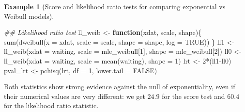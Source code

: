 \documentclass[
  11pt,
  letterpaper,
]{scrbook}
\newenvironment{Shaded}{\begin{snugshade}}{\end{snugshade}}
\newcommand{\AttributeTok}[1]{\textcolor[rgb]{0.40,0.45,0.13}{#1}}
\newcommand{\ConstantTok}[1]{\textcolor[rgb]{0.56,0.35,0.01}{#1}}
\newcommand{\ControlFlowTok}[1]{\textcolor[rgb]{0.00,0.23,0.31}{\textbf{#1}}}
\newcommand{\DecValTok}[1]{\textcolor[rgb]{0.68,0.00,0.00}{#1}}
\newcommand{\DocumentationTok}[1]{\textcolor[rgb]{0.37,0.37,0.37}{\textit{#1}}}
\newcommand{\FunctionTok}[1]{\textcolor[rgb]{0.28,0.35,0.67}{#1}}
\newcommand{\NormalTok}[1]{\textcolor[rgb]{0.00,0.23,0.31}{#1}}
\newcommand{\OtherTok}[1]{\textcolor[rgb]{0.00,0.23,0.31}{#1}}
\newcommand{\SpecialCharTok}[1]{\textcolor[rgb]{0.37,0.37,0.37}{#1}}
\theoremstyle{plain}
\theoremstyle{definition}
\newtheorem{example}{Example}[chapter]
\theoremstyle{definition}
\theoremstyle{plain}
\theoremstyle{remark}
\begin{document}
\begin{example}[Score and likelihood ratio tests for comparing
exponential vs Weibull
models]
\begin{Shaded}
\begin{Highlighting}[]
\DocumentationTok{\#\# Likelihood ratio test}
\NormalTok{ll\_weib }\OtherTok{\textless{}{-}} \ControlFlowTok{function}\NormalTok{(xdat, scale, shape)\{}
  \FunctionTok{sum}\NormalTok{(}\FunctionTok{dweibull}\NormalTok{(}\AttributeTok{x =}\NormalTok{ xdat, }\AttributeTok{scale =}\NormalTok{ scale, }\AttributeTok{shape =}\NormalTok{ shape, }\AttributeTok{log =} \ConstantTok{TRUE}\NormalTok{))}
\NormalTok{\}}
\NormalTok{ll1 }\OtherTok{\textless{}{-}} \FunctionTok{ll\_weib}\NormalTok{(}\AttributeTok{xdat =}\NormalTok{ waiting, }\AttributeTok{scale =}\NormalTok{ mle\_weibull[}\DecValTok{1}\NormalTok{], }\AttributeTok{shape =}\NormalTok{ mle\_weibull[}\DecValTok{2}\NormalTok{])}
\NormalTok{ll0 }\OtherTok{\textless{}{-}} \FunctionTok{ll\_weib}\NormalTok{(}\AttributeTok{xdat =}\NormalTok{ waiting, }\AttributeTok{scale =} \FunctionTok{mean}\NormalTok{(waiting), }\AttributeTok{shape =} \DecValTok{1}\NormalTok{)}
\NormalTok{lrt }\OtherTok{\textless{}{-}} \DecValTok{2}\SpecialCharTok{*}\NormalTok{(ll1}\SpecialCharTok{{-}}\NormalTok{ll0)}
\NormalTok{pval\_lrt }\OtherTok{\textless{}{-}} \FunctionTok{pchisq}\NormalTok{(lrt, }\AttributeTok{df =} \DecValTok{1}\NormalTok{, }\AttributeTok{lower.tail =} \ConstantTok{FALSE}\NormalTok{)}
\end{Highlighting}
\end{Shaded}

Both statistics show strong evidence against the null of exponentiality,
even if their numerical values are very different: we get \(24.9\) for
the score test and \(60.4\) for the likelihood ratio statistic.

\end{example}
\end{document}
